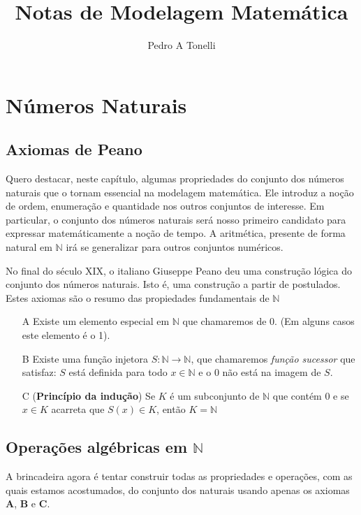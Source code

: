 \documentclass{book}
\title{Notas de Modelagem Matemática}
\author{Pedro A Tonelli}
\begin{document}
    \maketitle
    \chapter{Números Naturais}

    \section{Axiomas de Peano}

     Quero destacar, neste capítulo, algumas propriedades
    do conjunto dos números naturais que o tornam essencial na modelagem 
    matemática. Ele introduz a noção de ordem, enumeração e quantidade nos 
    outros conjuntos de interesse. Em particular, o conjunto dos números
    naturais será nosso primeiro candidato para expressar matemáticamente a 
    noção de tempo. A aritmética, presente de forma natural em 
  $\mathbb{N}$ irá se generalizar para outros conjuntos numéricos.

  No final do século XIX, o italiano Giuseppe Peano deu uma construção lógica do conjunto dos números naturais. Isto é, uma construção a partir de postulados. Estes axiomas são o resumo das propiedades fundamentais de $\mathbb{N}$

  \begin{itemize}
    \item[A] Existe um elemento especial  em $\mathbb{N}$ que chamaremos de $0$. (Em alguns casos este elemento é o 1).
    \item[B] Existe uma função injetora $S: \mathbb{N} \to \mathbb{N}$, que chamaremos \textit{função sucessor} que satisfaz: $S$ está definida para todo $x\in \mathbb{N}$ e o $0$ não está na imagem de $S$.
    \item[C] (\textbf{Princípio da indução}) Se $K$ é um subconjunto de $\mathbb{N}$ que contém $0$ e se $x\in K$ acarreta que $S(x)\in K$, então $K=\mathbb{N}$
    
  \end{itemize}
\section{Operações algébricas em $\mathbb{N}$}

A brincadeira agora é tentar construir todas as propriedades e operações, com as quais estamos acostumados, do conjunto dos naturais usando apenas os axiomas \textbf{A}, \textbf{B} e \textbf{C}.
\end{document}
